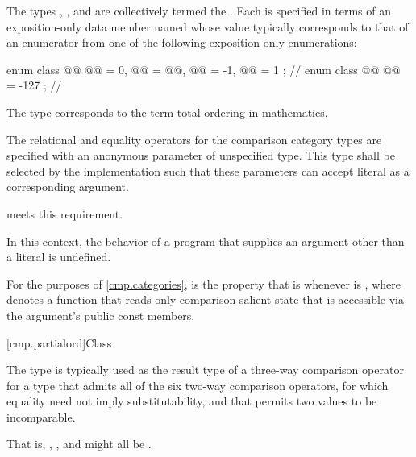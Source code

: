 \pnum
The types
,
, and
are collectively termed the .
Each is specified in terms of an exposition-only data member named 
whose value typically corresponds to that of an enumerator
from one of the following exposition-only enumerations:

\begin{codeblock}
enum class @@ { @@ = 0, @@ = @@, @@ = -1, @@ = 1 }; // \expos
enum class @@ { @@ = -127 };                                     // \expos
\end{codeblock}

\pnum
\begin{note}
The type 
corresponds to the term
total ordering in mathematics.
\end{note}

\pnum
The relational and equality operators for the comparison category types
are specified with an anonymous parameter of unspecified type.
This type shall be selected by the implementation such that
these parameters can accept literal  as a corresponding argument.
\begin{example}
meets this requirement.
\end{example}
In this context, the behavior of a program that supplies
an argument other than a literal  is undefined.

\pnum
For the purposes of \ref{cmp.categories},
 is the property that  is 
whenever  is ,
where  denotes a function that reads only comparison-salient state
that is accessible via the argument's public const members.

[cmp.partialord]{Class }

\pnum
The  type is typically used
as the result type of a three-way comparison operator
for a type that admits
all of the six two-way comparison operators,
for which equality need not imply substitutability,
and that permits two values to be incomparable.%
\begin{footnote}
That is, , , and  might all be .
\end{footnote}

